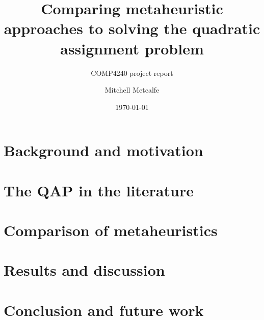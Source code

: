 


\title{Comparing metaheuristic approaches to solving the quadratic assignment problem}
\subtitle{COMP4240 project report}
\author{Mitchell Metcalfe}

\date{\today}




  \maketitle

%


  \section{Background and motivation} {
     \label{sec:introduction}
     
   }

  \section{The QAP in the literature} {
    \label{sec:literature-review}
    
  }

  \section{Comparison of metaheuristics} {
    \label{sec:methodology}
    
  }

  \section{Results and discussion} {
    \label{sec:results}
    
  }

  \section{Conclusion and future work} {
    \label{sec:conclusion}
    
  }

 \newpage
  
  


